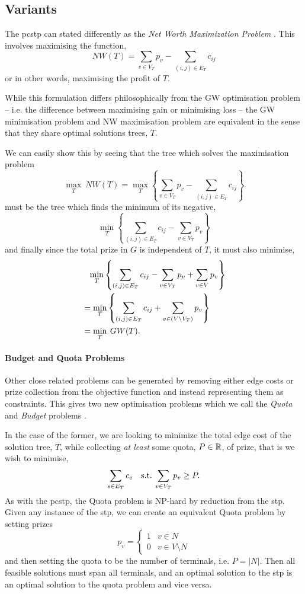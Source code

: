 \subsection{Variants}

 The \gls{pcstp} can stated differently as the {\textit{Net Worth Maximization Problem}} \citep{Johnson:2000:PCS:338219.338637}.
  This involves maximising the function,
$$NW(T) = \sum_{v \in V_T} p_v - \sum_{(i,j) \in E_T} c_{ij}$$
or in other words, maximising the profit of $T$.

While this formulation differs philosophically from the GW optimisation problem
-- i.e. the difference between maximising gain or minimising loss --
the GW minimisation problem and NW maximisation problem are equivalent in the sense that they share optimal solutions trees, $T$.


We can easily show this by seeing that the tree which solves the maximisation problem
$$\max_T \: NW(T) = \max_T \left\{ \sum_{v \in V_T} p_v - \sum_{(i,j) \in E_T} c_{ij} \right\}$$
must be the tree which finds the minimum of its negative,
$$\min_T \left\{ \sum_{(i,j) \in E_T} c_{ij} - \sum_{v \in V_T} p_v\right\}$$
and finally since the total prize in $G$ is independent of $T$, it must also minimise,
\begin{align*}
  &\phantom{=}\min_T \left\{ \sum_{(i,j) \in E_T} c_{ij} - \sum_{v \in V_T} p_v + \sum_{v \in V} p_v \right\} \\
  &=\min_T \left\{ \sum_{(i,j) \in E_T} c_{ij} + \sum_{v \in (V \setminus V_T)} p_v \right\} \\
  &= \min_T \: GW(T)\mathnormal{.}
\end{align*}

\paragraph{Budget and Quota Problems}

Other close related problems can be generated by removing either edge costs or prize collection from the
objective function and instead representing them as constraints. This gives two new optimisation problems
which we call the \textit{Quota} and \textit{Budget} problems \citep{Johnson:2000:PCS:338219.338637}.

In the case of the former, we are looking to minimize the total edge cost of the solution tree, $T$, while
collecting \textit{at least} some quota, $P \in \mathbb{R}$, of prize, that is we wish to minimise,
$$\sum_{e \in E_T} c_e \quad \text{s.t.} \: \sum_{v \in V_T} p_v \geq P\mathnormal{.}$$
As with the \gls{pcstp}, the Quota problem is NP-hard by reduction from the \gls{stp}. Given any instance of the \gls{stp},
we can create an equivalent Quota problem by setting prizes
$$p_v =
\begin{cases}
  1 & v \in N \\
  0 & v \in V \setminus N
\end{cases}
$$
and then setting the quota to be the number of terminals, i.e. $P = |N|$. Then all feasible solutions
must span all terminals, and an optimal solution to the \gls{stp} is an optimal solution to the quota problem
 and vice versa.

